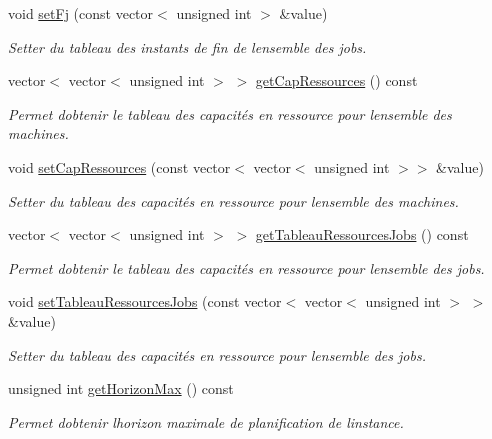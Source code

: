 \begin{DoxyCompactItemize}
void \hyperlink{classInstance_a544764ab0dcb42e795c5bfee4a0681cf}{set\+Fj} (const vector$<$ unsigned int $>$ \&value)
\begin{DoxyCompactList}\small\item\em Setter du tableau des instants de fin de l\textquotesingle{}ensemble des jobs. \end{DoxyCompactList}\item 
vector$<$ vector$<$ unsigned int $>$ $>$ \hyperlink{classInstance_a5dac330671540cf94e87b7586cd3102e}{get\+Cap\+Ressources} () const
\begin{DoxyCompactList}\small\item\em Permet d\textquotesingle{}obtenir le tableau des capacités en ressource pour l\textquotesingle{}ensemble des machines. \end{DoxyCompactList}\item 
void \hyperlink{classInstance_a527d6a6623e0257f4512a96285a960a5}{set\+Cap\+Ressources} (const vector$<$ vector$<$ unsigned int $>$$>$ \&value)
\begin{DoxyCompactList}\small\item\em Setter du tableau des capacités en ressource pour l\textquotesingle{}ensemble des machines. \end{DoxyCompactList}\item 
vector$<$ vector$<$ unsigned int $>$ $>$ \hyperlink{classInstance_ad4124bd2f1edb83a46ef94cfe07eafc8}{get\+Tableau\+Ressources\+Jobs} () const
\begin{DoxyCompactList}\small\item\em Permet d\textquotesingle{}obtenir le tableau des capacités en ressource pour l\textquotesingle{}ensemble des jobs. \end{DoxyCompactList}\item 
void \hyperlink{classInstance_a702ba79351487440788af8d662f1266c}{set\+Tableau\+Ressources\+Jobs} (const vector$<$ vector$<$ unsigned int $>$ $>$ \&value)
\begin{DoxyCompactList}\small\item\em Setter du tableau des capacités en ressource pour l\textquotesingle{}ensemble des jobs. \end{DoxyCompactList}\item 
unsigned int \hyperlink{classInstance_a8bf10528309a62149cc188dd2b80f0b7}{get\+Horizon\+Max} () const
\begin{DoxyCompactList}\small\item\em Permet d\textquotesingle{}obtenir l\textquotesingle{}horizon maximale de planification de l\textquotesingle{}instance. \end{DoxyCompactList}\item 
$$
\end{DoxyCompactItemize}
